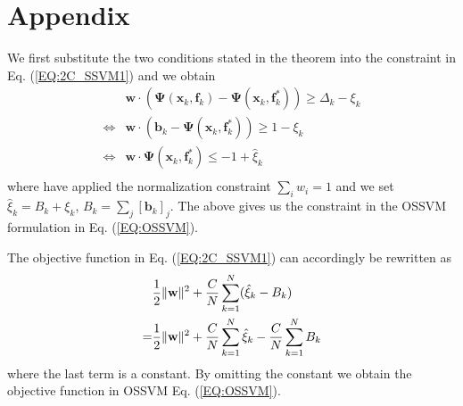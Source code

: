 \documentclass[10pt,journal,compsoc]{newIEEEtran}
\newenvironment{proof}[1][Proof]{\begin{trivlist}
		\item[\hskip \labelsep {\bfseries #1}]}{\end{trivlist}}
\begin{document}
\section*{Appendix}\begin{proof}[Proof of Theorem \ref{THM:2COEQ}]
	We first substitute the two conditions stated in the theorem into the constraint in Eq. (\ref{EQ:2C_SSVM1}) and we obtain
	\begin{equation}
	\begin{split}
	&\mathbf{w}\cdot(\mathbf{\Psi}(\mathbf{x}_k,\mathbf{f}_k)-\mathbf{\Psi}(\mathbf{x}_k,\mathbf{f}^*_k))\geq  \Delta_k - \xi_k\\
	\Leftrightarrow&\mathbf{w}\cdot(\mathbf{b}_k-\mathbf{\Psi}(\mathbf{x}_k,\mathbf{f}^*_k))\geq  1 - \xi_k\\
	\Leftrightarrow&\mathbf{w}\cdot\mathbf{\Psi}(\mathbf{x}_k,\mathbf{f}_k^*)\leq  -1 +\hat{\xi}_k\\
	\end{split}
	\end{equation}
	where have applied the normalization constraint $\sum_i w_i=1$ and we set $\hat{\xi}_k = {B}_k+ \xi_k$, ${B}_k=\sum_j[\mathbf{b}_k]_j$. The above gives us the constraint in the OSSVM formulation in Eq. (\ref{EQ:OSSVM}).

	The objective function in Eq. (\ref{EQ:2C_SSVM1}) can accordingly be rewritten as
	\begin{equation}
	\begin{split}
	&{1\over2}\|\mathbf{w}\|^2 + {C\over N}\sum_{k=1}^N (\hat{\xi}_k-{B}_k)\\
	=& {1\over2}\|\mathbf{w}\|^2 + {C\over N}\sum_{k=1}^N \hat{\xi}_k - {C\over N}\sum_{k=1}^N{B}_k\\
	\end{split}
	\end{equation}
	where the last term is a constant. By omitting the constant we obtain the objective function in OSSVM  Eq. (\ref{EQ:OSSVM}).


\end{proof}
\end{document}
